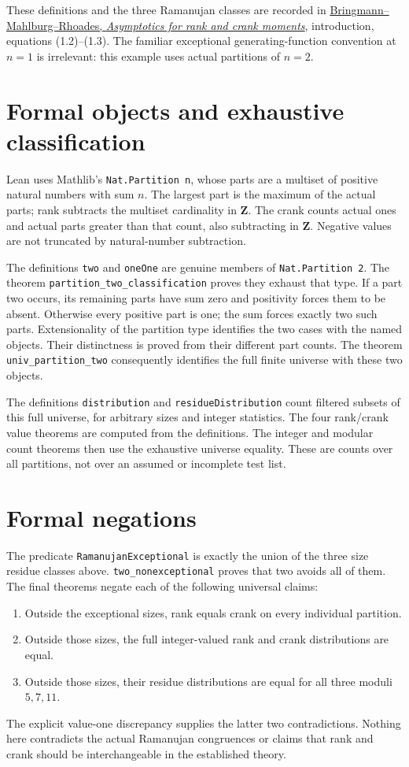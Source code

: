 \documentclass[11pt]{article}
\begin{document}
These definitions and the three Ramanujan classes are recorded in
\href{https://www.mi.uni-koeln.de/Bringmann/BMRFinalPublication.pdf}
{Bringmann--Mahlburg--Rhoades, \emph{Asymptotics for rank and crank
moments}}, introduction, equations (1.2)--(1.3).
The familiar exceptional generating-function convention at $n=1$
is irrelevant: this example uses actual partitions of $n=2$.

\newpage
\section{Formal objects and exhaustive classification}
Lean uses Mathlib's \texttt{Nat.Partition n}, whose parts are a
multiset of positive natural numbers with sum $n$. The largest
part is the maximum of the actual parts; rank subtracts the
multiset cardinality in $\mathbf Z$. The crank counts actual ones
and actual parts greater than that count, also subtracting in
$\mathbf Z$. Negative values are not truncated by natural-number
subtraction.

The definitions \texttt{two} and \texttt{oneOne} are genuine members
of \texttt{Nat.Partition 2}. The theorem
\texttt{partition\_two\_classification} proves they exhaust that
type. If a part two occurs, its remaining parts have sum zero and
positivity forces them to be absent. Otherwise every positive
part is one; the sum forces exactly two such parts. Extensionality
of the partition type identifies the two cases with the named
objects. Their distinctness is proved from their different part
counts. The theorem \texttt{univ\_partition\_two} consequently
identifies the full finite universe with these two objects.

The definitions \texttt{distribution} and
\texttt{residueDistribution} count filtered subsets of this full
universe, for arbitrary sizes and integer statistics. The four
rank/crank value theorems are computed from the definitions.
The integer and modular count theorems then use the exhaustive
universe equality. These are counts over all partitions, not over
an assumed or incomplete test list.

\section{Formal negations}
The predicate \texttt{RamanujanExceptional} is exactly the union
of the three size residue classes above.
\texttt{two\_nonexceptional} proves that two avoids all of them.
The final theorems negate each of the following universal claims:
\begin{enumerate}
\item Outside the exceptional sizes, rank equals crank on every
individual partition.
\item Outside those sizes, the full integer-valued rank and crank
distributions are equal.
\item Outside those sizes, their residue distributions are equal
for all three moduli $5,7,11$.
\end{enumerate}
The explicit value-one discrepancy supplies the latter two
contradictions. Nothing here contradicts the actual Ramanujan
congruences or claims that rank and crank should be interchangeable
in the established theory.
\end{document}

